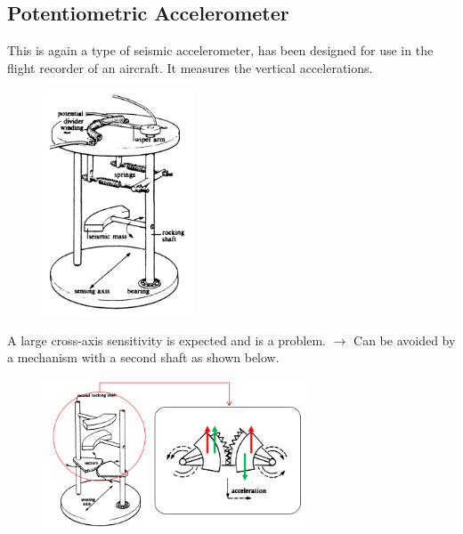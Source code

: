 \documentclass[class=report, crop=false, 12pt,a4paper]{standalone}
\begin{document}
\subsection{Potentiometric Accelerometer}
This is again a type of seismic accelerometer, has been designed for use in the flight recorder of an aircraft. It measures the vertical accelerations.
\begin{figure}[H]
  \centering
  \includegraphics[width = 0.4\textwidth]{../img/Mdiagram35.png}
\end{figure}
A large cross-axis sensitivity is expected and is a problem. $\longrightarrow$ Can be avoided by a mechanism with a second shaft as shown below.
\begin{figure}[H]
  \centering
  \includegraphics[width = 0.7\textwidth]{../img/Mdiagram36.png}
\end{figure}
\end{document}
